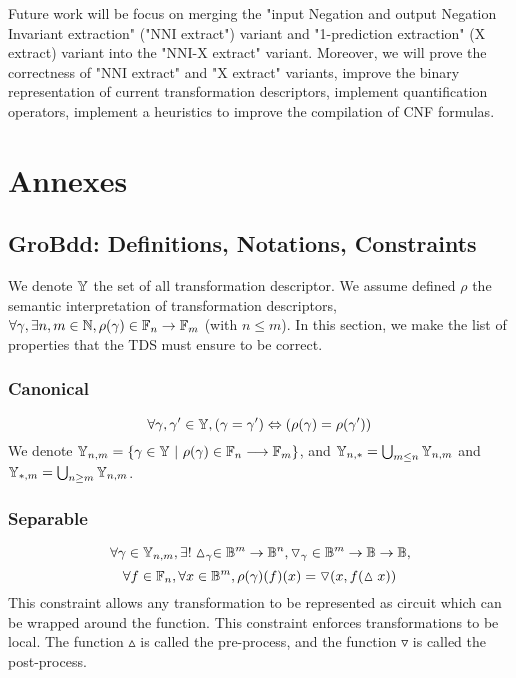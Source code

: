 \documentclass[a4paper,10pt]{article}
\begin{document}
Future work will be focus on merging the "input Negation and output Negation Invariant extraction" ("NNI extract") variant and "1-prediction extraction" (X extract) variant into the "NNI-X extract" variant.
Moreover, we will prove the correctness of "NNI extract" and "X extract" variants, improve the binary representation of current transformation descriptors, implement quantification operators, implement a heuristics to improve the compilation of CNF formulas.


\newpage
{}


\newpage
\tableofcontents

\newpage

\section{Annexes}

\subsection{GroBdd: Definitions, Notations, Constraints\label{grobdd-def}}

We denote $\mathbb{Y}$ the set of all transformation descriptor.
We assume defined $\rho$ the semantic interpretation of transformation descriptors, $\forall \gamma, \exists n, m \in\mathbb{N}, \rho(\gamma) \in \mathbb{F}_n \rightarrow \mathbb{F}_m$ (with $n\leq m$).
In this section, we make the list of properties that the TDS must ensure to be correct.

\subsubsection{Canonical}
\[\forall \gamma, \gamma' \in \mathbb{Y}, \left( \gamma = \gamma' \right) \Leftrightarrow \left( \rho(\gamma) = \rho(\gamma') \right) \]
We denote $\mathbb{Y}_{n, m} = \{ \gamma \in \mathbb{Y} ~|~ \rho(\gamma) \in \mathbb{F}_n \longrightarrow \mathbb{F}_m \}$, and $\mathbb{Y}_{n,*} = \bigcup_{m\leq n} \mathbb{Y}_{n, m}$ and $\mathbb{Y}_{*, m} = \bigcup_{n \geq m} \mathbb{Y}_{n, m}$.

\subsubsection{Separable}
\[\forall \gamma \in \mathbb{Y}_{n, m}, \exists! \vartriangle_\gamma \in \mathbb{B}^m \rightarrow \mathbb{B}^n, \triangledown_\gamma \in \mathbb{B}^m \rightarrow \mathbb{B} \rightarrow \mathbb{B},\]
\[\forall f\in \mathbb{F}_n, \forall x \in \mathbb{B}^m, \rho(\gamma)(f)(x) = \triangledown(x, f(\vartriangle x))\]
This constraint allows any transformation to be represented as circuit which can be wrapped around the function.
This constraint enforces transformations to be local.
The function $\vartriangle$ is called the pre-process, and the function $\triangledown$ is called the post-process.
\end{document}
